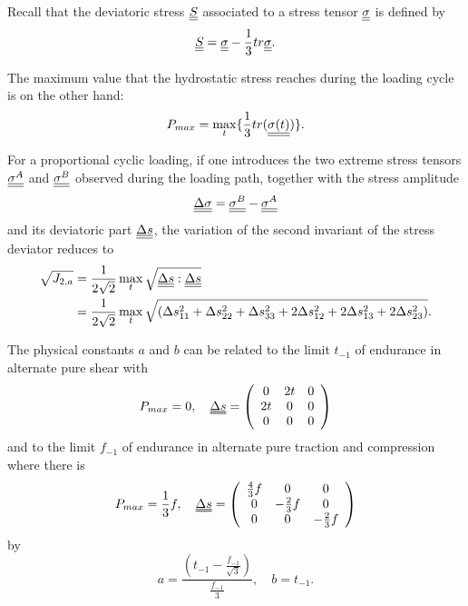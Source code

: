 Recall that the deviatoric stress $\uline{\uline{S}}$ associated to a stress tensor $\uline{\uline{\sigma}}$  is defined by
\begin{equation} \uline{\uline{S}}=\uline{\uline{\sigma}}-\frac{1}{3}tr\uline{\uline{\sigma}}.
\end{equation}

The maximum value that the hydrostatic stress reaches during the loading cycle is on the other hand:
\begin{equation}
P_{max}=\max\limits_{t}\{\frac{1}{3}tr(\uline{\uline{\sigma(t)}})\}.
\end{equation}

For a proportional cyclic loading, if one introduces the two extreme stress tensors $\uline{\uline{\sigma^A}}$ and $\uline{\uline{\sigma^B}}$ observed during the loading path, together with the stress amplitude
\begin{equation}\uline{\uline{\Delta\sigma}}=\uline{\uline{\sigma^B}}-\uline{\uline{\sigma^A}}\end{equation}
and its deviatoric part $\uline{\uline{\Delta s}} $, the variation of
the second invariant of the stress deviator reduces to 
\begin{equation}
		\begin{split}
			\sqrt{J_{2,a}}&=\frac{1}{2\sqrt{2}}\max\limits_{t}\sqrt{\uline{\uline{\Delta s}}:\uline{\uline{\Delta s}}}\\&=\frac{1}{2\sqrt{2}}\max\limits_{t}\sqrt{(\Delta s_{11}^2+\Delta s_{22}^2+\Delta s_{33}^2+2\Delta s_{12}^2+2\Delta s_{13}^2+2\Delta s_{23}^2)}.
			\end{split}
	\end{equation}

The physical constants $a$ and $b$ can be related to  the limit $t_{-1}$ of endurance in alternate pure shear with $$P_{max}=0, \quad \uuline{\Delta s}=	\left(
\begin{array}{ccc}
0 & 2t & 0\\
2t & 0 & 0\\ 
0 & 0 & 0\\
\end{array}\right)  $$  
and to the limit $f_{-1}$ of endurance in alternate pure traction and compression where there is
$$P_{max}=\frac{1}{3}f, \quad \uuline{\Delta s}=	\left(
\begin{array}{ccc}
\frac{4}{3}f & 0 & 0\\
0 & -\frac{2}{3}f & 0\\ 
0 & 0 & -\frac{2}{3}f\\
\end{array}\right)  $$  
by
\begin{equation}
a=\frac{(t_{-1}-\frac{f_{-1}}{\sqrt{3}})}{\frac{f_{-1}}{3}}, \quad 
b=t_{-1}.
\label{eq.ab}
\end{equation}


